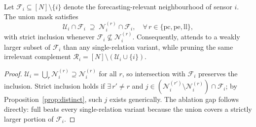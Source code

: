 \begin{proposition}
\label{prop:coverage}
Let $\mathcal{F}_i \subseteq [N]\setminus\{i\}$ denote the forecasting-relevant
neighbourhood of sensor $i$.
The union mask satisfies
\begin{equation}
  \mathcal{U}_i \cap \mathcal{F}_i \;\supseteq\; \mathcal{N}^{(r)}_i \cap \mathcal{F}_i,
  \quad \forall\, r \in \{\mathrm{pc},\mathrm{pe},\mathrm{ll}\},
  \label{eq:coverage}
\end{equation}
with strict inclusion whenever $\mathcal{F}_i \not\subseteq \mathcal{N}^{(r)}_i$.
Consequently, \mr{} attends to a weakly larger subset of $\mathcal{F}_i$ than any
single-relation variant, while pruning the same irrelevant complement
$\mathcal{R}_i = [N]\setminus(\mathcal{U}_i\cup\{i\})$.
\end{proposition}
\begin{proof}
$\mathcal{U}_i = \bigcup_{r}\mathcal{N}^{(r)}_i \supseteq \mathcal{N}^{(r)}_i$
for all $r$, so intersection with $\mathcal{F}_i$ preserves the inclusion.
Strict inclusion holds if $\exists\, r'\neq r$ and $j\in
(\mathcal{N}^{(r')}_i\setminus\mathcal{N}^{(r)}_i)\cap\mathcal{F}_i$; by
Proposition~\ref{prop:distinct}, such $j$ exists generically.
The ablation gap follows directly: full \mr{} beats every single-relation variant
because the union covers a strictly larger portion of $\mathcal{F}_i$.
\end{proof}

